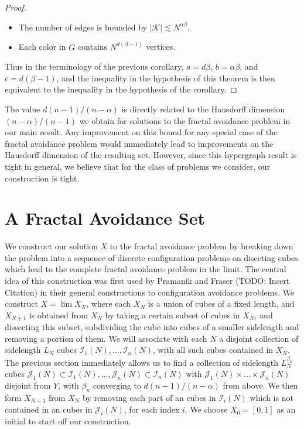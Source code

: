 \documentclass{article}
\theoremstyle{plain}
\theoremstyle{plain}
\begin{document}
\begin{multicols}{2}
\begin{proof}
\begin{itemize}
		\item The number of edges is bounded by $|\mathcal{K}| \lesssim N^{\alpha \beta}$.

		\item Each color in $G$ contains $N^{d(\beta - 1)}$ vertices.
	\end{itemize}
	Thus in the terminology of the previous corollary, $a = d \beta$, $b = \alpha \beta$, and $c = d(\beta - 1)$, and the inequality in the hypothesis of this theorem is then equivalent to the inequality in the hypothesis of the corollary.
\end{proof}

The value $d(n-1)/(n-\alpha)$ is directly related to the Hausdorff dimension $(n-\alpha)/(n-1)$ we obtain for solutions to the fractal avoidance problem in our main result. Any improvement on this bound for any special case of the fractal avoidance problem would immediately lead to improvements on the Hausdorff dimension of the resulting set. However, since this hypergraph result is tight in general, we believe that for the class of problems we consider, our construction is tight.


\section{A Fractal Avoidance Set}

We construct our solution $X$ to the fractal avoidance problem by breaking down the problem into a sequence of discrete configuration problems on disecting cubes which lead to the complete fractal avoidance problem in the limit. The central idea of this construction was first used by Pramanik and Fraser (TODO: Insert Citation) in their general constructions to configuration avoidance problems. We construct $X = \lim X_N$, where each $X_N$ is a union of cubes of a fixed length, and $X_{N+1}$ is obtained from $X_N$ by taking a certain subset of cubes in $X_N$, and dissecting this subset, subdividing the cube into cubes of a smaller sidelength and removing a portion of them. We will associate with each $N$ a disjoint collection of sidelength $L_N$ cubes $\mathcal{I}_1(N), \dots, \mathcal{I}_n(N)$, with all such cubes contained in $X_N$. The previous section immediately allows us to find a collection of sidelength $L_N^{\beta_n}$ cubes $\mathcal{J}_1(N) \subset \mathcal{I}_1(N), \dots, \mathcal{J}_n(N) \subset \mathcal{I}_n(N)$ with $\mathcal{J}_1(N) \times \dots \times \mathcal{J}_n(N)$ disjoint from $Y$, with $\beta_n$ converging to $d(n-1)/(n-\alpha)$ from above. We then form $X_{N+1}$ from $X_N$ by removing each part of an cubes in $\mathcal{I}_i(N)$ which is not contained in an cubes in $\mathcal{J}_i(N)$, for each index $i$. We choose $X_0 = [0,1]$ as an initial to start off our construction.


\end{multicols}
\end{document}
